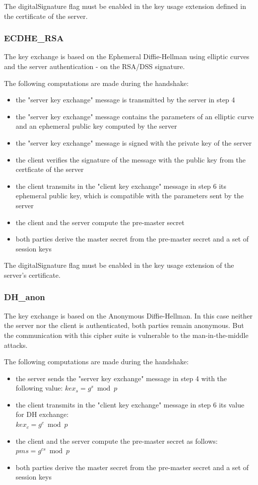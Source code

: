 The digitalSignature flag must be enabled in the key usage extension defined in the certificate of the server.

\subsubsection*{ECDHE\_RSA}
The key exchange is based on the Ephemeral Diffie-Hellman using elliptic curves and the server authentication - on the RSA/DSS signature.

The following computations are made during the handshake:
\begin{itemize}
	\item the "server key exchange" message is transmitted by the server in step 4 
	\item the "server key exchange" message contains the parameters of an elliptic curve and an ephemeral public key computed by the server
	\item the "server key exchange" message is signed with the private key of the server
	\item the client verifies the signature of the message with the public key from the certficate of the server
	\item the client transmits in the "client key exchange" message in step 6 its ephemeral public key, which is compatible with the parameters sent by the server
	\item the client and the server compute the pre-master secret
	\item both parties derive the master secret from the pre-master secret and a set of session keys
\end{itemize}

The digitalSignature flag must be enabled in the key usage extension of the server's certificate.

\subsubsection*{DH\_anon}
The key exchange is based on the Anonymous Diffie-Hellman. In this case neither the server nor the client is authenticated, both parties remain anonymous. But the communication with this cipher suite is vulnerable to the man-in-the-middle attacks.

The following computations are made during the handshake:
\begin{itemize}
	\item the server sends the "server key exchange" message in step 4 with the following value: $\displaystyle kex_s = g^s \bmod p $ 
	\item the client transmits in the "client key exchange" message in step 6 its value for DH exchange: \\ $\displaystyle kex_c = g^c \bmod p $ 
	\item the client and the server compute the pre-master secret as follows: $\displaystyle pms = g^{cs} \bmod p$
	\item both parties derive the master secret from the pre-master secret and a set of session keys
\end{itemize}


